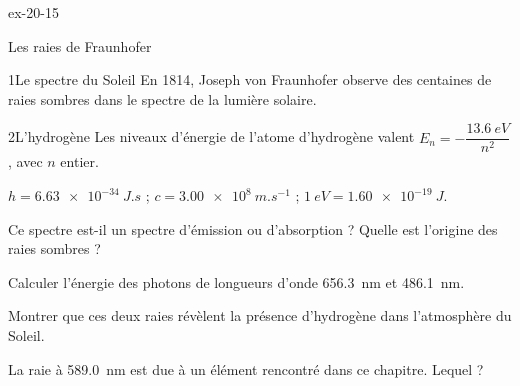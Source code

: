 \begin{blocLivre}{ex-20-15}
\begin{exercice}[3]{Les raies de Fraunhofer}
\begin{docu}{1}{Le spectre du Soleil}
En 1814, Joseph von Fraunhofer observe des centaines de raies sombres dans le spectre de la lumière solaire.
\end{docu}
\begin{docu}{2}{L'hydrogène}
Les niveaux d'énergie de l'atome d'hydrogène valent $E_n=-\dfrac{\qty{13,6}{eV}}{n^2}$, avec $n$ entier.
\end{docu}
\begin{donnees}
$h=\qty{6,63e-34}{J.s}$ ; $c=\qty{3,00e8}{m.s^{-1}}$ ; $\qty{1}{eV}=\qty{1,60e-19}{J}$.
\end{donnees}
\begin{questions}
\item Ce spectre est-il un spectre d'émission ou d'absorption ? Quelle est l'origine des raies sombres ?
\item Calculer l'énergie des photons de longueurs d'onde \qty{656,3}{nm} et \qty{486,1}{nm}.
\item \initiative Montrer que ces deux raies révèlent la présence d'hydrogène dans l'atmosphère du Soleil.
\item La raie à \qty{589,0}{nm} est due à un élément rencontré dans ce chapitre. Lequel ?
\end{questions}
\end{exercice}
\end{blocLivre}

